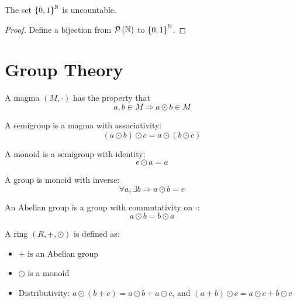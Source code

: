 \begin{theorem}
The set $\set{0,1}^{\mathbb{N}}$ is uncountable.
\end{theorem}
\begin{proof}
    Define a bijection from $\mathcal{P}\left( \mathbb{N} \right)$ to $\set{0,1}^{\mathbb{N}}$.
\end{proof}


\section{Group Theory}

%
%

\begin{definition}[magma]
    A magma $(M, \cdot)$ has the property that
    \begin{equation}
        a, b \in M \Rightarrow a \odot b \in M
    \end{equation}
\end{definition}

\begin{definition}[semigroup]
    A semigroup is a magma with associativity:
    \begin{equation}
        (a \odot b) \odot c = a \odot (b \odot c)
    \end{equation}
\end{definition}

\begin{definition}[monoid]
    A monoid is a semigroup with identity:
    \begin{equation}
        e \odot a = a
    \end{equation}
\end{definition}

\begin{definition}[group]
    A group is monoid with inverse:
    \begin{equation}
        \forall a, \exists b \Rightarrow a \odot b = e
    \end{equation}
\end{definition}

\begin{definition}
    An Abelian group is a group with commutativity on $\cdot$:
    \begin{equation}
        a \odot b = b \odot a
    \end{equation}
\end{definition}

\begin{definition}[ring]
    A ring $(R, +, \odot)$ is defined as:
    \begin{itemize}
        \item $+$ is an Abelian group
        \item $\odot$ is a monoid
        \item Distributivity: $a \odot (b + c) = a \odot b + a \odot c$, and $(a+b) \odot c = a \odot c + b \odot c$
    \end{itemize}
    
\end{definition}

